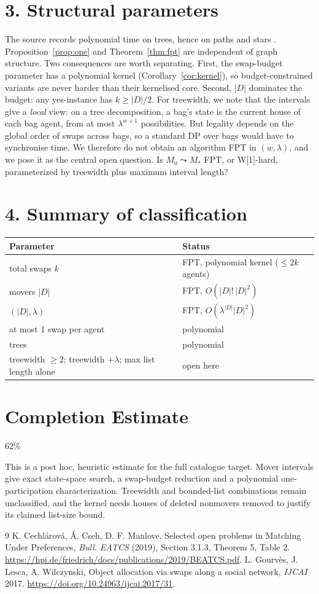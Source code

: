 \documentclass[11pt]{article}
\theoremstyle{definition}
\begin{document}
\section*{3. Structural parameters}
The source records polynomial time on trees, hence on paths and stars \cite{glw,ccm}. Proposition~\ref{prop:one} and
Theorem~\ref{thm:fpt} are independent of graph structure. Two consequences are worth separating. First, the swap-budget
parameter has a polynomial kernel (Corollary~\ref{cor:kernel}), so budget-constrained variants are never harder than
their kernelised core. Second, $|D|$ dominates the budget: any yes-instance has $k\ge|D|/2$. For treewidth, we note that
the intervals give a \emph{local} view: on a tree decomposition, a bag's state is the current house of each bag agent,
from at most $\lambda^{w+1}$ possibilities. But legality depends on the global order of swaps across bags, so a
standard DP over bags would have to synchronise time. We therefore do not obtain an algorithm FPT in $(w,\lambda)$, and
we pose it as the central open question. Is $M_0\leadsto M_*$ FPT, or W[1]-hard, parameterized by treewidth plus maximum
interval length?

\section*{4. Summary of classification}
\begin{center}
\begin{tabular}{ll}
Parameter & Status \\\hline
total swaps $k$ & FPT, polynomial kernel ($\le2k$ agents) \\
movers $|D|$ & FPT, $O(|D|!\,|D|^2)$ \\
$(|D|,\lambda)$ & FPT, $O(\lambda^{|D|}|D|^2)$ \\
at most 1 swap per agent & polynomial \\
trees & polynomial \cite{glw} \\
treewidth $\ge2$; treewidth $+\lambda$; max list length alone & open here
\end{tabular}
\end{center}

\section{Completion Estimate}
62\%

This is a post hoc, heuristic estimate for the full catalogue target.
Mover intervals give exact state-space search, a swap-budget reduction and a polynomial one-participation characterization. Treewidth and bounded-list combinations remain unclassified, and the kernel needs houses of deleted nonmovers removed to justify its claimed list-size bound.

\begin{thebibliography}{9}
 K. Cechl\'arov\'a, \'A. Cseh, D. F. Manlove, Selected open problems in Matching Under Preferences,
\emph{Bull. EATCS} (2019), Section 3.1.3, Theorem 5, Table 2. \url{https://hpi.de/friedrich/docs/publications/2019/BEATCS.pdf}.
 L. Gourv\`es, J. Lesca, A. Wilczynski, Object allocation via swaps along a social network, \emph{IJCAI}
2017. \url{https://doi.org/10.24963/ijcai.2017/31}.
\end{thebibliography}
\end{document}
